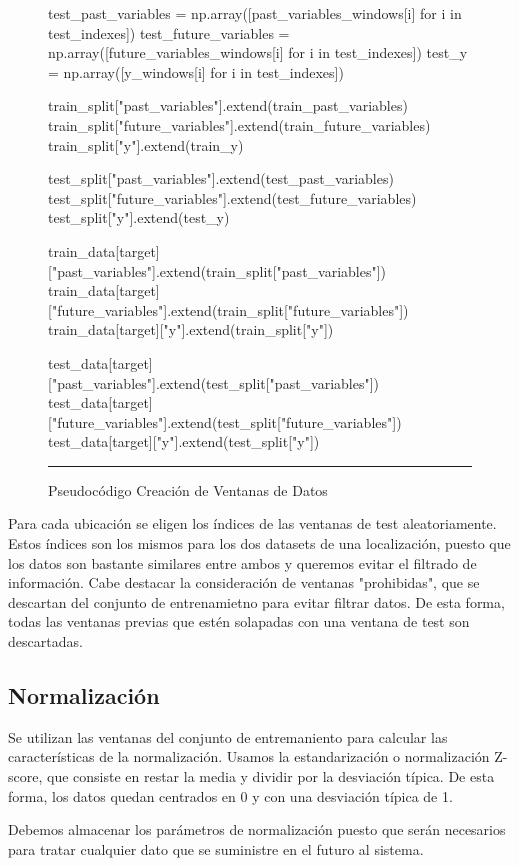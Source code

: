 \begin{figure}[H]
{\begin{center}
\begin{tabbing}
        test_past_variables = np.array([past_variables_windows[i] for i in test_indexes])
        test_future_variables = np.array([future_variables_windows[i] for i in test_indexes])
        test_y = np.array([y_windows[i] for i in test_indexes])
        
        train_split["past_variables"].extend(train_past_variables)
        train_split["future_variables"].extend(train_future_variables)
        train_split["y"].extend(train_y)
        
        test_split["past_variables"].extend(test_past_variables)
        test_split["future_variables"].extend(test_future_variables)
        test_split["y"].extend(test_y)
      
      train_data[target]["past_variables"].extend(train_split["past_variables"])
      train_data[target]["future_variables"].extend(train_split["future_variables"])
      train_data[target]["y"].extend(train_split["y"])
      
      test_data[target]["past_variables"].extend(test_split["past_variables"])
      test_data[target]["future_variables"].extend(test_split["future_variables"])
      test_data[target]["y"].extend(test_split["y"])

\end{tabbing}
\end{center}
\hrule
}
\caption{Pseudocódigo Creación de Ventanas de Datos}
\label{branch_and_bound_max_diversity}
\end{figure}

Para cada ubicación se eligen los índices de las ventanas de test aleatoriamente. Estos índices son los mismos para los dos datasets de una localización, 
puesto que los datos son bastante similares entre ambos y queremos evitar el filtrado de información. 
Cabe destacar la consideración de ventanas "prohibidas", que se descartan del conjunto de entrenamietno para evitar filtrar datos.
De esta forma, todas las ventanas previas que estén solapadas con una ventana de test son descartadas.

\subsection{Normalización}
Se utilizan las ventanas del conjunto de entremaniento para calcular las características de la normalización.
Usamos la estandarización o normalización Z-score, que consiste en restar la media y dividir por la desviación típica.
De esta forma, los datos quedan centrados en 0 y con una desviación típica de 1.

Debemos almacenar los parámetros de normalización puesto que serán necesarios para tratar cualquier dato que se suministre en el futuro al sistema.
